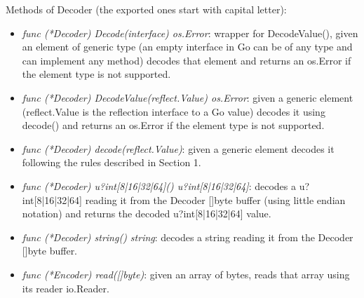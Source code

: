 Methods of Decoder (the exported ones start with capital letter):

\begin{itemize}

	\item \emph{func (*Decoder) Decode(interface{}) os.Error}: wrapper for DecodeValue(), given an element of generic type (an empty interface in Go can be of any type and can implement any method) decodes that element and returns an os.Error if the element type is not supported.
		\item \emph{func (*Decoder) DecodeValue(reflect.Value) os.Error}: given a generic element (reflect.Value is the reflection interface to a Go value) decodes it using decode() and returns an os.Error if the element type is not supported.
		\item \emph{func (*Decoder) decode(reflect.Value)}: given a generic element decodes it following the rules described in Section 1.
		\item \emph{func (*Decoder) u?int[8|16|32|64]() u?int[8|16|32|64]}: decodes a u?int[8|16|32|64] reading it from the Decoder []byte buffer (using little endian notation) and returns the decoded u?int[8|16|32|64] value.
		\item \emph{func (*Decoder) string() string}: decodes a string reading it from the Decoder []byte buffer.
		\item \emph{func (*Encoder) read([]byte)}: given an array of bytes, reads that array using its reader io.Reader.

\end{itemize}


